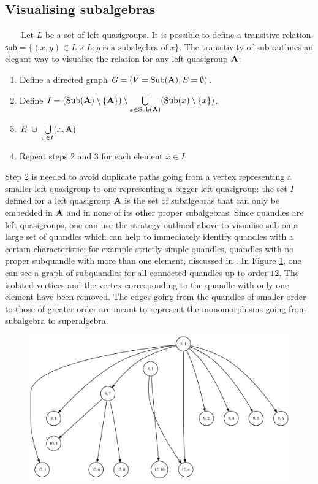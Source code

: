 \documentclass{mcom-l}
\begin{document}
\subsection{Visualising subalgebras}\textcolor{white}{line}\newline
Let $L$ be a set of left quasigroups.\newline
It is possible to define a transitive relation $\textsf{sub} = \{(x, y) \in L\times L: y~\text{is a subalgebra of}~x\}$. The transitivity of \textsf{sub} outlines an elegant way to visualise the relation for any left quasigroup $\mathbf{A}$:
\begin{enumerate}
    \item Define a directed graph $G = (V = \operatorname{Sub}(\mathbf{A}), E = \emptyset)$.
    \item Define $I = (\operatorname{Sub}(\mathbf{A})\setminus \{\mathbf{A}\})\setminus \bigcup\limits_{x\in \operatorname{Sub}(\mathbf{A})} (\operatorname{Sub}(x) \setminus \{x\})$.
    \item $E~\cup~\bigcup\limits_{x \in I} (x,\mathbf{A})$
    \item Repeat steps 2 and 3 for each element $x \in I$.
\end{enumerate}
\noindent Step 2 is needed to avoid duplicate paths going from a vertex representing a smaller left quasigroup to one representing a bigger left quasigroup: the set $I$ defined for a left quasigroup $\mathbf{A}$ is the set of subalgebras that can only be embedded in $\mathbf{A}$ and in none of its other proper subalgebras.\newline
\noindent Since quandles are left quasigroups, one can use the strategy outlined above to visualise \textsf{sub} on a large set of quandles  which can help to immediately identify quandles with a certain characteristic; for example strictly simple quandles, quandles with no proper subquandle with more than one element, discussed in \cite{bonatto2020principal}.\newline
In Figure \ref{fig:subqgraph}, one can see a graph of subquandles for all connected quandles up to order $12$. The isolated vertices and the vertex corresponding to the quandle with only one element have been removed. The edges going from the quandles of smaller order to those of greater order are meant to represent the monomorphisms going from subalgebra to superalgebra.

   
\begin{figure}[H]
    \centering
    \includegraphics[scale = 0.4]{Thesis/images/SubQuandle1.eps}
    \caption{}
    \label{fig:subqgraph}
\end{figure}
\end{document}
